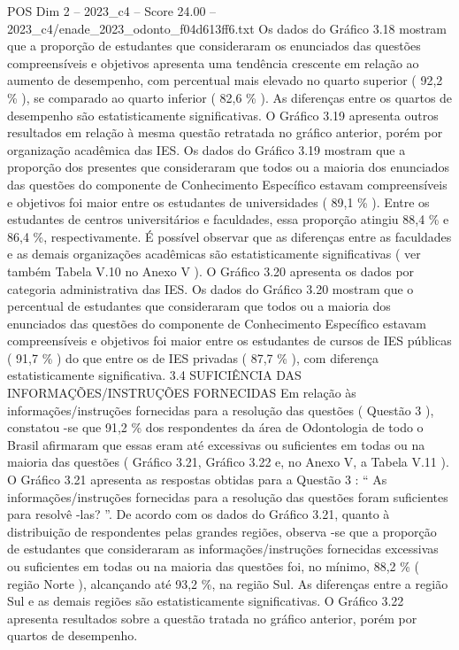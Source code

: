 \begin{textsample}{POS Dim 2 – 2023\_c4 – Score 24.00 – 2023\_c4/enade\_2023\_odonto\_f04d613ff6.txt}
Os dados do Gráfico 3.18 mostram que a proporção de estudantes que consideraram os enunciados das questões compreensíveis e objetivos apresenta uma tendência crescente em relação ao aumento de desempenho, com percentual mais elevado no quarto superior ( 92,2 \% ), se comparado ao quarto inferior ( 82,6 \% ).
As diferenças entre os quartos de desempenho são estatisticamente significativas.
O Gráfico 3.19 apresenta outros resultados em relação à mesma questão retratada no gráfico anterior, porém por organização acadêmica das IES.
Os dados do Gráfico 3.19 mostram que a proporção dos presentes que consideraram que todos ou a maioria dos enunciados das questões do componente de Conhecimento Específico estavam compreensíveis e objetivos foi maior entre os estudantes de universidades ( 89,1 \% ).
Entre os estudantes de centros universitários e faculdades, essa proporção atingiu 88,4 \% e 86,4 \%, respectivamente.
É possível observar que as diferenças entre as faculdades e as demais organizações acadêmicas são estatisticamente significativas ( ver também Tabela V.10 no Anexo V ).
O Gráfico 3.20 apresenta os dados por categoria administrativa das IES.
Os dados do Gráfico 3.20 mostram que o percentual de estudantes que consideraram que todos ou a maioria dos enunciados das questões do componente de Conhecimento Específico estavam compreensíveis e objetivos foi maior entre os estudantes de cursos de IES públicas ( 91,7 \% ) do que entre os de IES privadas ( 87,7 \% ), com diferença estatisticamente significativa. 3.4 SUFICIÊNCIA DAS INFORMAÇÕES/INSTRUÇÕES FORNECIDAS Em relação às informações/instruções fornecidas para a resolução das questões ( Questão 3 ), constatou -se que 91,2 \% dos respondentes da área de Odontologia de todo o Brasil afirmaram que essas eram até excessivas ou suficientes em todas ou na maioria das questões ( Gráfico 3.21, Gráfico 3.22 e, no Anexo V, a Tabela V.11 ).
O Gráfico 3.21 apresenta as respostas obtidas para a Questão 3 : “ As informações/instruções fornecidas para a resolução das questões foram suficientes para resolvê -las? ”.
De acordo com os dados do Gráfico 3.21, quanto à distribuição de respondentes pelas grandes regiões, observa -se que a proporção de estudantes que consideraram as informações/instruções fornecidas excessivas ou suficientes em todas ou na maioria das questões foi, no mínimo, 88,2 \% ( região Norte ), alcançando até 93,2 \%, na região Sul.
As diferenças entre a região Sul e as demais regiões são estatisticamente significativas.
O Gráfico 3.22 apresenta resultados sobre a questão tratada no gráfico anterior, porém por quartos de desempenho.

\end{textsample}
